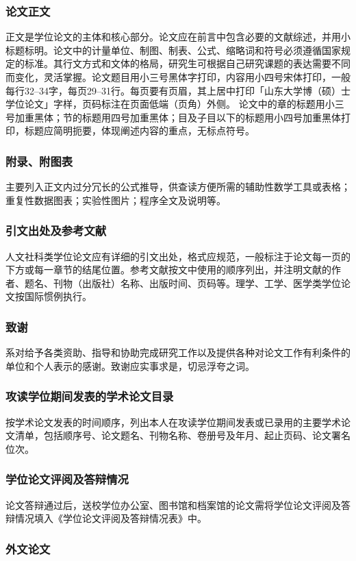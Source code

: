 \documentclass[openany]{sduthesis} %
\begin{document}
\subsubsection{论文正文}
正文是学位论文的主体和核心部分。论文应在前言中包含必要的文献综述，并用小标题标明。论文中的计量单位、制图、制表、公式、缩略词和符号必须遵循国家规定的标准。其行文方式和文体的格局，研究生可根据自己研究课题的表达需要不同而变化，灵活掌握。论文题目用小三号黑体字打印，内容用小四号宋体打印，一般每行32--34字，每页29--31行。每页要有页眉，其上居中打印「山东大学博（硕）士学位论文」字样，页码标注在页面低端（页角）外侧。 论文中的章的标题用小三号加重黑体；节的标题用四号加重黑体；目及子目以下的标题用小四号加重黑体打印，标题应简明扼要，体现阐述内容的重点，无标点符号。
\subsubsection{附录、附图表}
主要列入正文内过分冗长的公式推导，供查读方便所需的辅助性数学工具或表格；重复性数据图表；实验性图片；程序全文及说明等。
\subsubsection{引文出处及参考文献}
人文社科类学位论文应有详细的引文出处，格式应规范，一般标注于论文每一页的下方或每一章节的结尾位置。参考文献按文中使用的顺序列出，并注明文献的作者、题名、刊物（出版社）名称、出版时间、页码等。理学、工学、医学类学位论文按国际惯例执行。
\subsubsection{致谢}
系对给予各类资助、指导和协助完成研究工作以及提供各种对论文工作有利条件的单位和个人表示的感谢。致谢应实事求是，切忌浮夸之词。
\subsubsection{攻读学位期间发表的学术论文目录}
按学术论文发表的时间顺序，列出本人在攻读学位期间发表或已录用的主要学术论文清单，包括顺序号、论文题名、刊物名称、卷册号及年月、起止页码、论文署名位次。
\subsubsection{学位论文评阅及答辩情况}
论文答辩通过后，送校学位办公室、图书馆和档案馆的论文需将学位论文评阅及答辩情况填入《学位论文评阅及答辩情况表》中。
\subsubsection{外文论文}
\end{document}

